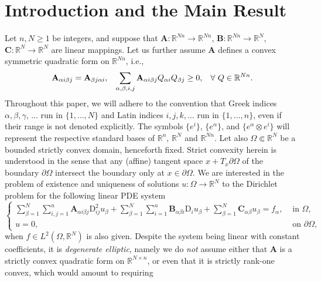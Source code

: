 \documentclass{amsart}
\numberwithin{equation}{section}
\numberwithin{thm}{section}
\theoremstyle{definition}
\def\p{\mathrm{p}}
\renewcommand{\:}{\!:\!} %
\renewcommand{\p}{\partial}
\renewcommand{\^}[1]{^{#1}_{\phantom{l}}}
\begin{document}
\section{Introduction and the Main Result}

\noindent
Let $n, N \geq 1$ be integers, and suppose that $\mathbf{A} : \mathbb{R}^{Nn} \longrightarrow \mathbb{R}^{Nn}$, $\mathbf{B}: \mathbb{R}^{Nn} \longrightarrow \mathbb{R}^{N}$, $\mathbf{C}: \mathbb{R}^{N} \longrightarrow \mathbb{R}^{N}$ are linear mappings. Let us further assume $\mathbf{A}$ defines a convex symmetric quadratic form on $\mathbb{R}^{Nn}$, i.e.,
\begin{equation} \label{eq:0}
\mathbf{A}_{\alpha i \beta j} = \mathbf{A}_{\beta j \alpha i}, \hspace{0.3cm} \sum_{\alpha, \beta, i, j} \mathbf{A}_{\alpha i \beta j} Q_{\alpha i} Q_{\beta j} \geq 0, \hspace{0.3cm} \forall\ Q \in \mathbb{R}^{Nn}.
\end{equation}
Throughout this paper, we will adhere to the convention that Greek indices $\alpha, \beta, \gamma$,  $\ldots$ run in $\{1, \dotsc, N \}$ and Latin indices $i, j, k, \ldots$ run in $\{1, \dotsc, n \}$, even if their range is not denoted explicitly. The symbols $\{e^i \}$, $\{e^\alpha \}$, and $\{e^\alpha \otimes e^i \}$ will represent the respective standard bases of $\mathbb{R}^n$, $\mathbb{R}^N$ and $\mathbb{R}^{Nn}$.  Let also $\Omega \Subset \mathbb{R}^N$ be a bounded strictly convex domain, henceforth fixed. Strict convexity herein is understood in the sense that any (affine) tangent space $x+T_x\p\Omega$ of the boundary $\p\Omega$ intersect the boundary only at $x \in \p\Omega$. We are interested in the problem of existence and uniqueness of solutions $u : \Omega \longrightarrow \mathbb{R}^N$ to the Dirichlet problem for the following linear PDE system
\begin{equation} \label{eq:1}
 \left\{
\begin{array}{rl}
\displaystyle\sum_{\beta = 1}^{N}\sum_{i, j = 1}^{n} \mathbf{A}_{\alpha i \beta j}\mathrm{D}_{ij}^{2}u_{\beta} + \sum_{\beta = 1}^{N} \sum_{i=1}^{n} \mathbf{B}_{\alpha \beta i}\mathrm{D}_{i}u_{\beta} + \sum_{\beta = 1}^{N} \mathbf{C}_{\alpha \beta}u_{\beta} = f_\alpha, &\text{ in $\Omega$}, 
\\
u = 0,\ \,& \text{ on $\partial \Omega$},
\end{array} 
\right. 
\end{equation}
when $f \in L^2(\Omega, \mathbb{R}^N)$ is also given. Despite the system being linear with constant coefficients, it is {\it degenerate elliptic}, namely we do {\it not} assume either that $ \mathbf{A}$ is a strictly convex quadratic form on $\mathbb R^{N\times n}$, or even that it is strictly rank-one convex, which would amount to requiring
\end{document}
